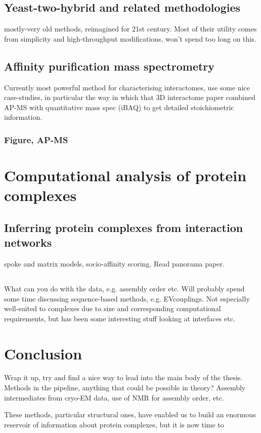 \documentclass[a4paper,11pt,twoside,openright]{scrbook}
\let\cite\supercite
\begin{document}
\subsection{Yeast-two-hybrid and related methodologies}
mostly-very old methods, reimagined for 21st century. Most of their utility comes from simplicity and high-throughput modifications, won't spend too long on this.

\subsection{Affinity purification mass spectrometry}
Currently most powerful method for characterising interactomes, use some nice case-studies, in particular the way in which that 3D interactome paper \cite{Hein2015} combined AP-MS with quantitative mass spec (iBAQ) to get detailed stoichiometric information.


\subsubsection{Figure, AP-MS}

\section{Computational analysis of protein complexes}
\subsection{Inferring protein complexes from interaction networks}
spoke and matrix models, socio-affinity scoring. Read panorama paper. \cite{Wan2015}
\subsection{}
What can you do with the data, e.g. assembly order etc. Will probably spend some time discussing sequence-based methods, e.g. EVcouplings. Not especially well-suited to complexes due to size and corresponding computational requirements, but has been some interesting stuff looking at interfaces etc.

\section{Conclusion}
Wrap it up, try and find a nice way to lead into the main body of the thesis. Methods in the pipeline, anything that could be possible in theory? Assembly intermediates from cryo-EM data, use of NMR for assembly order, etc.

These methods, particular structural ones, have enabled us to build an enormous reservoir of information about protein complexes, but it is now time to

\printbibliography
\end{document}
